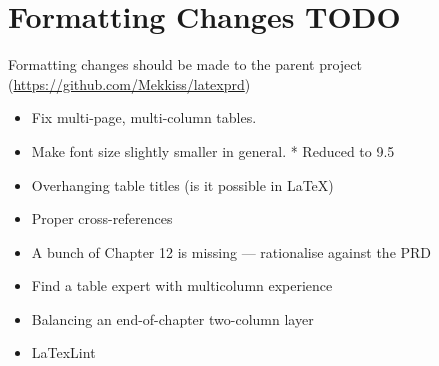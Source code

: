 \section{Formatting Changes TODO}

Formatting changes should be made to the parent project (\url{https://github.com/Mekkiss/latexprd})

\begin{itemize}
 \item Fix multi-page, multi-column tables.
 \item Make font size slightly smaller in general. * Reduced to 9.5
 \item Overhanging table titles (is it possible in \LaTeX )
 \item Proper cross-references
 \item A bunch of Chapter 12 is missing --- rationalise against the PRD
\end{itemize}

\begin{itemize}
 \item Find a table expert with multicolumn experience
 \item Balancing an end-of-chapter two-column layer
 \item LaTexLint
\end{itemize}

